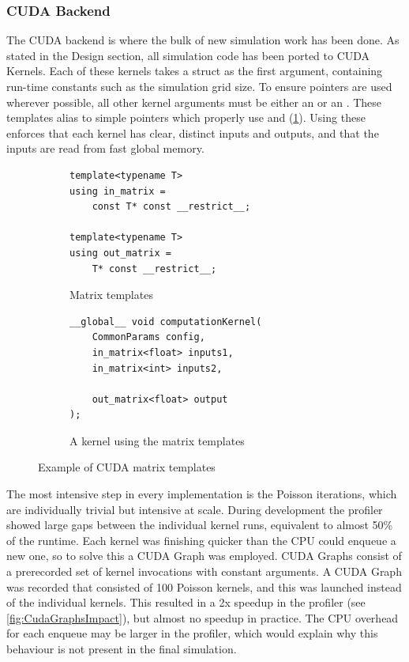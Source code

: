 \subsubsection{CUDA Backend}
The CUDA backend is where the bulk of new simulation work has been done.
As stated in the Design section, all simulation code has been ported to CUDA Kernels.
Each of these kernels takes a  struct as the first argument, containing run-time constants such as the simulation grid size.
To ensure  pointers are used wherever possible, all other kernel arguments must be either an  or an .
These templates alias to simple pointers which properly use  and  (\cref{fig:ImplMatrices}).
Using these enforces that each kernel has clear, distinct inputs and outputs, and that the inputs are read from fast global memory.

\begin{figure}[t]
    \centering
    \begin{subfigure}{0.49\textwidth}
        \begin{verbatim}
template<typename T>
using in_matrix = 
    const T* const __restrict__;

template<typename T>
using out_matrix = 
    T* const __restrict__;
        \end{verbatim}
        \caption{Matrix templates}
    \end{subfigure}%
    \begin{subfigure}{0.49\textwidth}
        \begin{verbatim}
__global__ void computationKernel(
    CommonParams config,
    in_matrix<float> inputs1,
    in_matrix<int> inputs2,
    
    out_matrix<float> output
);
        \end{verbatim}
        \caption{A kernel using the matrix templates}
    \end{subfigure}
    \caption{Example of CUDA matrix templates}
    \label{fig:ImplMatrices}
\end{figure}

The most intensive step in every implementation is the Poisson iterations, which are individually trivial but intensive at scale.
During development the profiler showed large gaps between the individual kernel runs, equivalent to almost 50\% of the runtime.
Each kernel was finishing quicker than the CPU could enqueue a new one, so to solve this a CUDA Graph was employed.
CUDA Graphs consist of a prerecorded set of kernel invocations with constant arguments.
A CUDA Graph was recorded that consisted of 100 Poisson kernels, and this was launched instead of the individual kernels.
This resulted in a 2x speedup in the profiler (see \cref{fig:CudaGraphsImpact}), but almost no speedup in practice.
The CPU overhead for each enqueue may be larger in the profiler, which would explain why this behaviour is not present in the final simulation.

